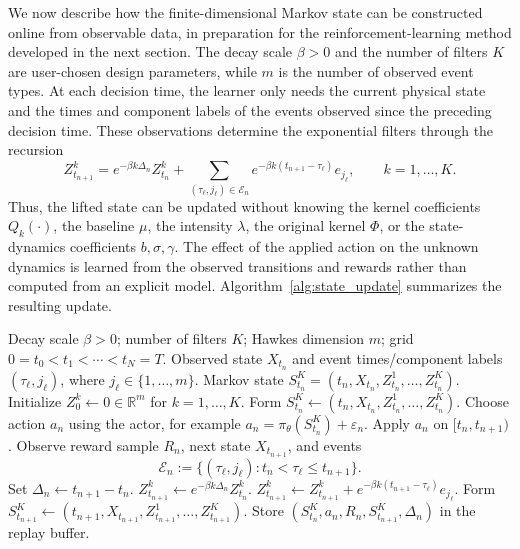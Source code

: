 \documentclass[11pt]{article}
\theoremstyle{remarkitalic}
\theoremstyle{remarkitalic}
\newcommand{\R}{\mathbb R}
\newcommand{\1}{\mathbf 1}
\begin{document}
We now describe how the finite-dimensional Markov state can be
constructed online from observable data, in preparation for the
reinforcement-learning method developed in the next section. The decay
scale $\beta>0$ and the number of filters $K$ are user-chosen design
parameters, while $m$ is the number of observed event types. At each
decision time, the learner only needs the current physical state and the
times and component labels of the events observed since the preceding
decision time. These observations determine the exponential filters
through the recursion
\[
    Z^k_{t_{n+1}}
    =
    e^{-\beta k\Delta_n}Z^k_{t_n}
    +
    \sum_{(\tau_\ell,j_\ell)\in\mathcal E_n}
    e^{-\beta k(t_{n+1}-\tau_\ell)}e_{j_\ell},
    \qquad k=1,\ldots,K.
\]
Thus, the lifted state can be updated without knowing the kernel
coefficients $Q_k(\cdot)$, the baseline $\mu$, the intensity
$\lambda$, the original kernel $\Phi$, or the state-dynamics
coefficients $b,\sigma,\gamma$. The effect of the applied action on
the unknown dynamics is learned from the observed transitions and
rewards rather than computed from an explicit model.
Algorithm~\ref{alg:state_update} summarizes the resulting update.

\begin{algorithm}[H]
\caption{Online Markov-state update for current-action readout}
\label{alg:state_update}
\begin{algorithmic}[1]
\Require Decay scale $\beta>0$; number of filters $K$; Hawkes dimension $m$; grid $0=t_0<t_1<\cdots<t_N=T$.
\Require Observed state $X_{t_n}$ and event times/component labels $(\tau_\ell,j_\ell)$, where $j_\ell\in\{1,\dots,m\}$.
\Ensure Markov state $S_{t_n}^K=(t_n,X_{t_n},Z_{t_n}^1,\dots,Z_{t_n}^K)$.
\State Initialize $Z_0^k\gets 0\in\R^m$ for $k=1,\dots,K$.
    \State Form $S_{t_n}^K\gets (t_n,X_{t_n},Z_{t_n}^1,\dots,Z_{t_n}^K)$.
    \State Choose action $a_n$ using the actor, for example $a_n=\pi_\theta(S_{t_n}^K)+\varepsilon_n$.
    \State Apply $a_n$ on $[t_n,t_{n+1})$.
    \State Observe reward sample $R_n$, next state $X_{t_{n+1}}$, and events
    \[
        \mathcal E_n:=\{(\tau_\ell,j_\ell):t_n<\tau_\ell\le t_{n+1}\}.
    \]
    \State Set $\Delta_n\gets t_{n+1}-t_n$.
        \State $Z_{t_{n+1}}^k\gets e^{-\beta k\Delta_n}Z_{t_n}^k$.
            \State $Z_{t_{n+1}}^k\gets Z_{t_{n+1}}^k+e^{-\beta k(t_{n+1}-\tau_\ell)}e_{j_\ell}$.
        \EndFor
    \EndFor
    \State Form $S_{t_{n+1}}^K\gets(t_{n+1},X_{t_{n+1}},Z_{t_{n+1}}^1,\dots,Z_{t_{n+1}}^K)$.
    \State Store $(S_{t_n}^K,a_n,R_n,S_{t_{n+1}}^K,\Delta_n)$ in the replay buffer.
\EndFor
\end{algorithmic}
\end{algorithm}
\end{document}
